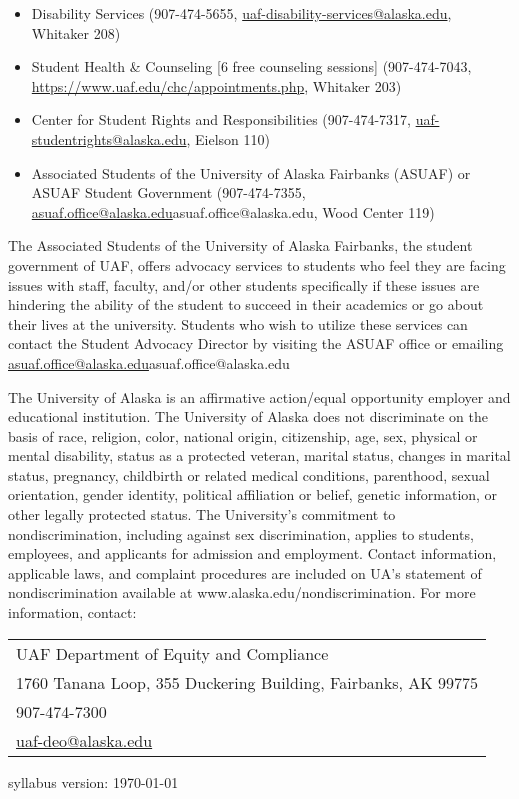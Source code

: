 \documentclass[12pt]{article}
\def\mailto#1{\href{mailto:#1}{#1}}
\begin{document}
\begin{itemize}
\setlength\itemsep{0em}
\item Disability Services (907-474-5655, \mailto{uaf-disability-services@alaska.edu}, Whitaker 208)
\item Student Health \& Counseling [6 free counseling sessions] (907-474-7043, \url{https://www.uaf.edu/chc/appointments.php}, Whitaker 203)
\item Center for Student Rights and Responsibilities (907-474-7317, \mailto{uaf-studentrights@alaska.edu}, Eielson 110)
\item Associated Students of the University of Alaska Fairbanks (ASUAF) or ASUAF Student Government (907-474-7355, \mailto{asuaf.office@alaska.edu}{asuaf.office@alaska.edu}, Wood Center 119)
\end{itemize}

The Associated Students of the University of Alaska Fairbanks, the student government of UAF, offers advocacy services to students who feel they are facing issues with staff, faculty, and/or other students specifically if these issues are hindering the ability of the student to succeed in their academics or go about their lives at the university. Students who wish to utilize these services can contact the Student Advocacy Director by visiting the ASUAF office or emailing \mailto{asuaf.office@alaska.edu}{asuaf.office@alaska.edu}

The University of Alaska is an affirmative action/equal opportunity employer and educational institution. The University of Alaska does not discriminate on the basis of race, religion, color, national origin, citizenship, age, sex, physical or mental disability, status as a protected veteran, marital status, changes in marital status, pregnancy, childbirth or related medical conditions, parenthood, sexual orientation, gender identity, political affiliation or belief, genetic information, or other legally protected status. The University's commitment to nondiscrimination, including against sex discrimination, applies to students, employees, and applicants for admission and employment. Contact information, applicable laws, and complaint procedures are included on UA's statement of nondiscrimination available at www.alaska.edu/nondiscrimination. For more information, contact:

\begin{tabular}{l}
UAF Department of Equity and Compliance\\
1760 Tanana Loop, 355 Duckering Building, Fairbanks, AK  99775\\
907-474-7300\\
\mailto{uaf-deo@alaska.edu}
\end{tabular}

\vfill

\quad \hfill \scriptsize syllabus version: \today \normalsize
\end{document}
